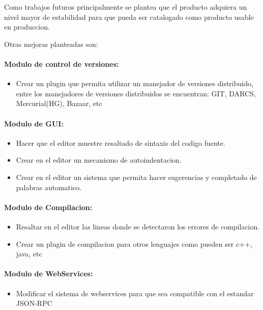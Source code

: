 Como trabajos futuros principalmente se plantea que el producto adquiera un nivel mayor de estabilidad para que pueda ser catalogado como producto usable en produccion.

Otras mejoras planteadas son:

\paragraph{Modulo de control de versiones:}

\begin{itemize}
	\item Crear un plugin que permita utilizar un manejador de versiones distribuido, entre los manejadores de versiones distribuidos se encuentran: GIT, DARCS, Mercurial(HG), Bazaar, etc
\end{itemize}

\paragraph{Modulo de GUI:}

\begin{itemize}
	\item Hacer que el editor muestre resaltado de sintaxis del codigo fuente.
	\item Crear en el editor un mecanismo de autoindentacion.
	\item Crear en el editor un sistema que permita hacer sugerencias y completado de palabras automatico.
\end{itemize}

\paragraph{Modulo de Compilacion:}

\begin{itemize}
	\item Resaltar en el editor las lineas donde se detectaron los errores de compilacion.
	\item Crear un plugin de compilacion para otros lenguajes como pueden ser c++, java, etc
\end{itemize}

\paragraph{Modulo de WebServices:}

\begin{itemize}
	\item Modificar el sistema de webservices para que sea compatible con el estandar JSON-RPC \cite{json-rpc}
\end{itemize}

